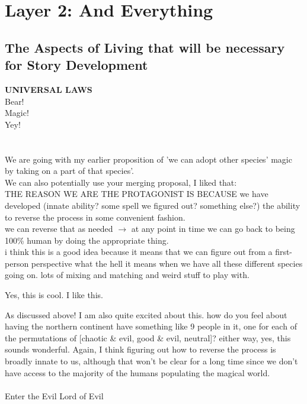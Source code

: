\chapter*{Layer 2: And Everything}

\section*{The Aspects of Living that will be necessary for Story Development} 

\R 
\textbf{UNIVERSAL LAWS} \\
Bear! \\
Magic! \\
Yey! \\ \\ \\


We are going with my earlier proposition of 'we can adopt other species' magic by taking on a part of that species'. \\
We can also potentially use your merging proposal, I liked that: \\
THE REASON WE ARE THE PROTAGONIST IS BECAUSE
we have developed (innate ability? some spell we figured out? something else?) the ability to reverse the process in some convenient fashion. \\ 
we can reverse that as needed $\rightarrow$ at any point in time we can go back to being 100\% human by doing the appropriate thing. \\
i think this is a good idea because it means that we can figure out from a first-person perspective what the hell it means when we have all these different species going on. lots of mixing and matching and weird stuff to play with.

\A Yes, this is cool. I like this. 

\R As discussed above!  I am also quite excited about this.  how do you feel about having the northern continent have something like 9 people in it, one for each of the permutations of [chaotic \& evil, good \& evil, neutral]?  either way, yes, this sounds wonderful.  Again, I think figuring out how to reverse the process is broadly innate to us, although that won't be clear for a long time since we don't have access to the majority of the humans populating the magical world. \\ \\

Enter the Evil Lord of Evil \\

